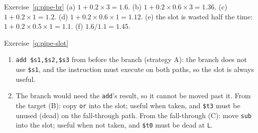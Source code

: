 \begin{noot}{Exercise~\ref{q:pipe-br}}
(a) $1+0.2\times3=1.6$. (b) $1+0.2\times0.6\times3=1.36$. (c) $1+0.2\times1=1.2$.
(d) $1+0.2\times0.6\times1=1.12$. (e) the slot is wasted half the time:
$1+0.2\times0.5\times1=1.1$. (f) $1.6/1.1=1.45$.
\end{noot}

\begin{noot}{Exercise~\ref{q:pipe-slot}}
\begin{enumerate}[label=(\alph*),leftmargin=*]
  \item \texttt{add \$s1,\$s2,\$s3} from before the branch (strategy A): the branch
  does not use \texttt{\$s1}, and the instruction must execute on both paths, so
  the slot is always useful.
  \item The branch would need the \texttt{add}'s result, so it cannot be moved past
  it. From the target (B): copy \texttt{or} into the slot; useful when taken, and
  \texttt{\$t3} must be unused (dead) on the fall-through path. From the
  fall-through (C): move \texttt{sub} into the slot; useful when not taken, and
  \texttt{\$t0} must be dead at \texttt{L}.
\end{enumerate}
\end{noot}

